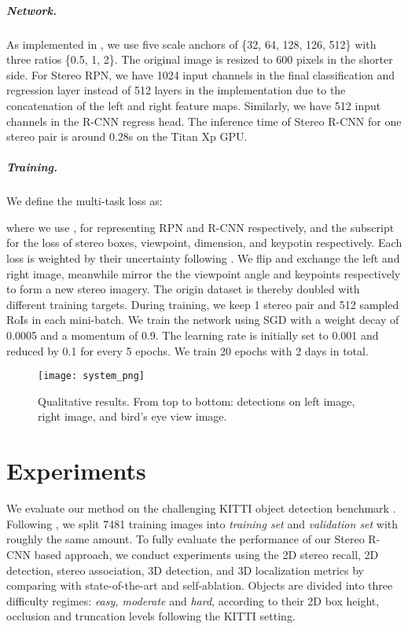\documentclass[10pt,twocolumn,letterpaper]{article}
\begin{document}
	{\setlength{\parindent}{0cm}
		\subparagraph*{Network.} As implemented in \cite{ren2015faster}, we use five scale anchors of \{32, 64, 128, 126, 512\} with three ratios \{0.5, 1, 2\}. The original image is resized to 600 pixels in the shorter side. For Stereo RPN, we have 1024 input channels in the final classification and regression layer instead of 512 layers in the implementation \cite{lin2017feature}  due to the concatenation of the left and right feature maps. Similarly, we have 512 input channels in the R-CNN regress head.
		The inference time of Stereo R-CNN for one stereo pair is around 0.28s on the Titan Xp GPU.}
	{\setlength{\parindent}{0cm}
		\subparagraph*{Training.} We define the multi-task loss as:
		
		where we use ,  for representing RPN and R-CNN respectively, and the subscript  for the loss of stereo boxes, viewpoint, dimension, and keypotin respectively. Each loss is weighted by their uncertainty following \cite{kendall2017multi}. We flip and exchange the left and right image, meanwhile mirror the the viewpoint angle and keypoints respectively to form a new stereo imagery. The origin dataset is thereby doubled with different training targets. During training, we keep 1 stereo pair and 512 sampled RoIs in each mini-batch. We train the network using SGD with a weight decay of 0.0005 and a momentum of 0.9. The learning rate is initially set to 0.001 and reduced by 0.1 for every 5 epochs. We train 20 epochs with 2 days in total.
	}
\begin{figure*}
		\begin{center}
			\texttt{[image: system\_png]}
		\end{center}
		\caption{Qualitative results. From top to bottom: detections on left image, right image, and bird's eye view image.}
		\label{fig:vis}
\end{figure*}
	\section{Experiments}
	We evaluate our method on the challenging KITTI object detection benchmark \cite{geiger2012we}. Following \cite{3dopJournal}, we split 7481 training images into \textit{training set} and \textit{validation set} with roughly the same amount. To fully evaluate the performance of our Stereo R-CNN based approach, we conduct experiments using the 2D stereo recall, 2D detection, stereo association, 3D detection, and 3D localization metrics by comparing with state-of-the-art and self-ablation. Objects are divided into three difficulty regimes: \textit{easy, moderate} and \textit{hard}, according to their 2D box height, occlusion and truncation levels following the KITTI setting.
	
\end{document}
